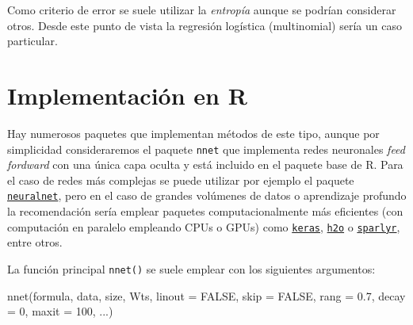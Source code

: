 \documentclass[
  spanish,
]{book}
\newenvironment{Shaded}{\begin{snugshade}}{\end{snugshade}}
\newcommand{\AttributeTok}[1]{\textcolor[rgb]{0.77,0.63,0.00}{#1}}
\newcommand{\ConstantTok}[1]{\textcolor[rgb]{0.00,0.00,0.00}{#1}}
\newcommand{\DecValTok}[1]{\textcolor[rgb]{0.00,0.00,0.81}{#1}}
\newcommand{\FloatTok}[1]{\textcolor[rgb]{0.00,0.00,0.81}{#1}}
\newcommand{\FunctionTok}[1]{\textcolor[rgb]{0.00,0.00,0.00}{#1}}
\newcommand{\NormalTok}[1]{#1}
\theoremstyle{break}
\theoremstyle{definition}
\theoremstyle{definition}
\theoremstyle{definition}
\theoremstyle{definition}
\theoremstyle{remark}
\begin{document}
Como criterio de error se suele utilizar la \emph{entropía} aunque se podrían considerar otros.
Desde este punto de vista la regresión logística (multinomial) sería un caso particular.

\hypertarget{implementaciuxf3n-en-r-2}{%
\section{Implementación en R}\label{implementaciuxf3n-en-r-2}}

Hay numerosos paquetes que implementan métodos de este tipo, aunque por simplicidad consideraremos el paquete \texttt{nnet} que implementa redes neuronales \emph{feed fordward} con una única capa oculta y está incluido en el paquete base de R.
Para el caso de redes más complejas se puede utilizar por ejemplo el paquete \href{https://CRAN.R-project.org/package=neuralnet}{\texttt{neuralnet}}, pero en el caso de grandes volúmenes de datos o aprendizaje profundo la recomendación sería emplear paquetes computacionalmente más eficientes (con computación en paralelo empleando CPUs o GPUs) como \href{https://keras.rstudio.com}{\texttt{keras}}, \href{https://github.com/h2oai/h2o-3}{\texttt{h2o}} o \href{https://spark.rstudio.com/}{\texttt{sparlyr}}, entre otros.

La función principal \texttt{nnet()} se suele emplear con los siguientes argumentos:

\begin{Shaded}
\begin{Highlighting}[]
\FunctionTok{nnet}\NormalTok{(formula, data, size, Wts, }\AttributeTok{linout =} \ConstantTok{FALSE}\NormalTok{, }\AttributeTok{skip =} \ConstantTok{FALSE}\NormalTok{, }
     \AttributeTok{rang =} \FloatTok{0.7}\NormalTok{, }\AttributeTok{decay =} \DecValTok{0}\NormalTok{, }\AttributeTok{maxit =} \DecValTok{100}\NormalTok{, ...)}
\end{Highlighting}
\end{Shaded}
\end{document}
